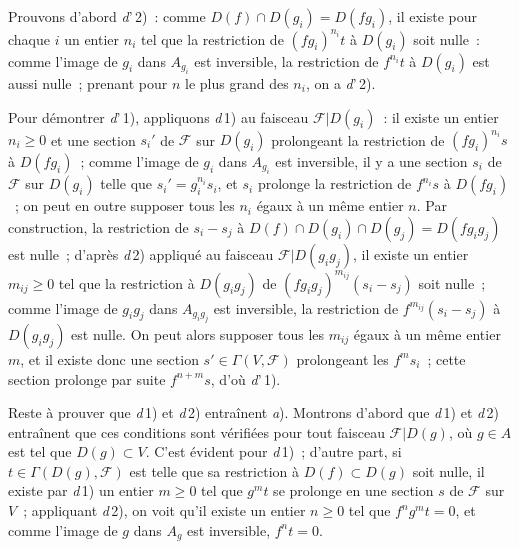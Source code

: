 Prouvons d'abord \textit{d}'\,2)~: comme
$D(f)\cap D(g_i)=D(fg_i)$, il existe pour chaque $i$ un entier $n_i$ tel
que la restriction de $(fg_i)^{n_i}t$ à $D(g_i)$ soit nulle~: comme
l'image de $g_i$ dans $A_{g_i}$ est inversible, la restriction de
$f^{n_i}t$ à $D(g_i)$ est aussi nulle~; prenant pour $n$ le plus grand des
$n_i$, on a \textit{d}'\,2).

Pour démontrer \textit{d}'\,1), appliquons \textit{d}\,1) au faisceau
$\mathscr{F}|D(g_i)$~: il existe un entier $n_i\geq0$ et une section $s_i'$
de $\mathscr{F}$ sur $D(g_i)$ prolongeant la restriction de
$(fg_i)^{n_i}s$ à $D(fg_i)$~; comme l'image de $g_i$ dans $A_{g_i}$ est
inversible, il y a une section $s_i$ de $\mathscr{F}$ sur $D(g_i)$ telle
que $s_i'=g_i^{n_i}s_i$, et $s_i$ prolonge la restriction de $f^{n_i}s$ à
$D(fg_i)$~; on peut en outre supposer tous les $n_i$ égaux à un même
entier $n$. Par construction, la restriction de $s_i-s_j$ à
$D(f)\cap D(g_i)\cap D(g_j)=D(fg_i g_j)$ est nulle~; d'après
\textit{d}\,2) appliqué au faisceau $\mathscr{F}|D(g_i g_j)$, il existe un
entier $m_{ij}\geq0$ tel que la restriction à $D(g_i g_j)$ de
$(fg_i g_j)^{m_{ij}}(s_i-s_j)$ soit nulle~; comme l'image de $g_i g_j$
dans $A_{g_i g_j}$ est inversible, la restriction de
$f^{m_{ij}}(s_i-s_j)$ à $D(g_i g_j)$ est nulle. On peut alors supposer tous
les $m_{ij}$ égaux à un même entier $m$, et il existe donc une section
$s'\in\Gamma(V,\mathscr{F})$ prolongeant les $f^m s_i$~; cette section
prolonge par suite $f^{n+m}s$, d'où \textit{d}'\,1).

Reste à prouver que \textit{d}\,1) et \textit{d}\,2) entraînent
\textit{a}). Montrons d'abord que \textit{d}\,1) et \textit{d}\,2)
entraînent que ces conditions sont vérifiées pour tout faisceau
$\mathscr{F}|D(g)$, où $g\in A$ est tel que $D(g)\subset V$. C'est évident
pour \textit{d}\,1)~; d'autre part, si $t\in\Gamma(D(g),\mathscr{F})$ est
telle que sa restriction à $D(f)\subset D(g)$ soit nulle, il existe par
\textit{d}\,1) un entier $m\geq0$ tel que $g^m t$ se
prolonge en une section $s$ de $\mathscr{F}$ sur $V$~; appliquant
\textit{d}\,2), on voit qu'il existe un entier $n\geq0$ tel que
$f^n g^m t=0$, et comme l'image de $g$ dans $A_g$ est inversible, $f^n t=0$.

